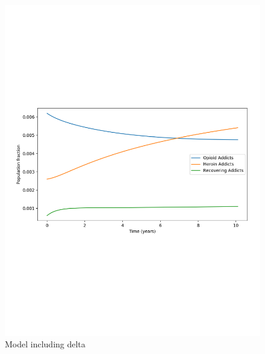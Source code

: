 \documentclass[12pt]{article}
\begin{document}
\vspace{-1cm}

\begin{figure}[!htb]
\hspace{-.8cm}
\begin{minipage}{.6\textwidth}
\centering
\includegraphics[width=.9\linewidth, height=0.26\textheight]{plot_with_delta_separate}
\vspace{-.4cm}
\caption{Model including delta}
\end{minipage}
\hspace{-1.3cm}
\vspace{.5cm}
\begin{minipage}{.6\textwidth}
\centering

\end{minipage}
\end{figure}
\end{document}
